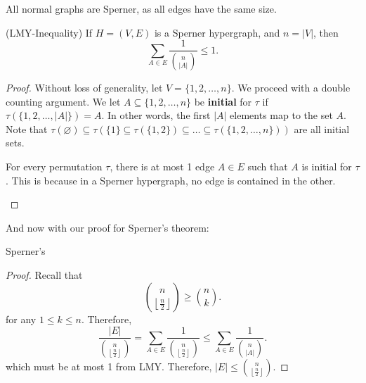 
\begin{note}
	All normal graphs are Sperner, as all edges have the same size.
\end{note}

\begin{lemma}
	(LMY-Inequality) If \( H=(V,E) \) is a Sperner hypergraph, and \( n=|V| \), then \[
		\sum_{A \in E} \frac{1}{\binom{n}{|A|}} \le 1
	.\] 
\end{lemma}
\begin{proof}
	Without loss of generality, let \( V = \{1, 2, \ldots , n\}   \). We proceed with a double counting argument. We let \( A \subseteq \{1, 2, \ldots ,n \}   \) be \textbf{initial} for \( \tau  \) if \( \tau (\{1, 2, \ldots , |A|\}  ) =A\). In other words, the first \( |A| \) elements map to the set \( A \). Note that \( \tau (\varnothing) \subseteq \tau (\{1\} \subseteq \tau (\{1,2\}  ) \subseteq \ldots \subseteq \tau (\{1, 2, \ldots , n\}  ) )\) are all initial sets.

	\begin{observation}
		For every permutation \( \tau  \), there is at most 1 edge \( A \in E \) such that \( A \) is initial for \( \tau  \). This is because in a Sperner hypergraph, no edge is contained in the other.
	\end{observation}
\end{proof}

And now with our proof for Sperner's theorem:

\begin{theorem}
	Sperner's
\end{theorem}
\begin{proof}
	Recall that \[
		\binom{n}{\left\lfloor \frac{n}{2} \right\rfloor} \ge \binom{n}{k}
	.\] for any \( 1\le k\le n \). Therefore, \[
		\frac{|E|}{\binom{n}{\left\lfloor \frac{n}{2} \right\rfloor}} = \sum_{A \in E} \frac{1}{\binom{n}{\left\lfloor \frac{n}{2} \right\rfloor}} \le \sum_{A \in E}\frac{1}{\binom{n}{|A|}}
	.\] which must be at most 1 from LMY. Therefore, \( |E| \le \binom{n}{\left\lfloor \frac{n}{2} \right\rfloor} \).
\end{proof}
